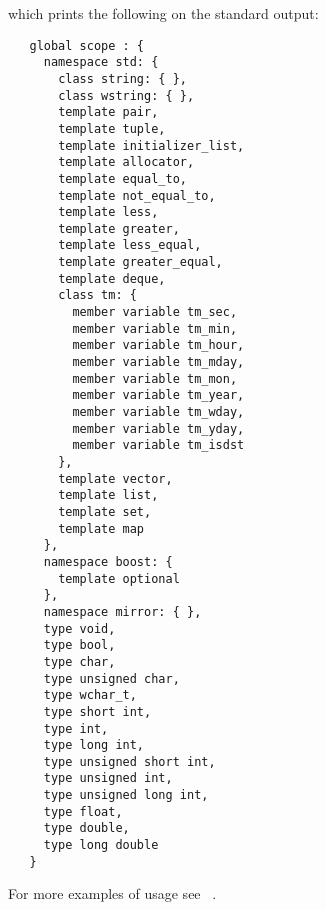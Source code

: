 which prints the following on the standard output:

\begin{verbatim}
   global scope : {
     namespace std: {
       class string: { },
       class wstring: { },
       template pair,
       template tuple,
       template initializer_list,
       template allocator,
       template equal_to,
       template not_equal_to,
       template less,
       template greater,
       template less_equal,
       template greater_equal,
       template deque,
       class tm: {
         member variable tm_sec,
         member variable tm_min,
         member variable tm_hour,
         member variable tm_mday,
         member variable tm_mon,
         member variable tm_year,
         member variable tm_wday,
         member variable tm_yday,
         member variable tm_isdst
       },
       template vector,
       template list,
       template set,
       template map
     },
     namespace boost: {
       template optional
     },
     namespace mirror: { },
     type void,
     type bool,
     type char,
     type unsigned char,
     type wchar_t,
     type short int,
     type int,
     type long int,
     type unsigned short int,
     type unsigned int,
     type unsigned long int,
     type float,
     type double,
     type long double
   }
\end{verbatim}

For more examples of usage see ~\cite{mirror-doc-puddle-examples}.
